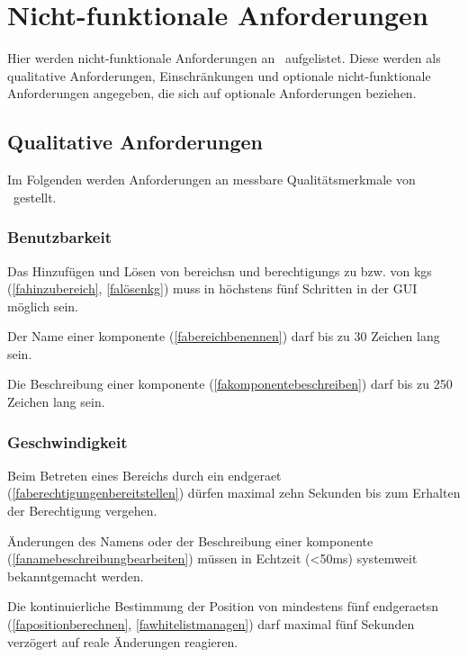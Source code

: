 \section{Nicht-funktionale Anforderungen}

Hier werden nicht-funktionale Anforderungen an \getProjectName \ aufgelistet. Diese werden als qualitative Anforderungen, Einschränkungen und optionale nicht-funktionale Anforderungen angegeben, die sich auf optionale Anforderungen beziehen.

\subsection{Qualitative Anforderungen}

Im Folgenden werden Anforderungen an messbare Qualitätsmerkmale von \getProjectName \ gestellt.

\subsubsection{Benutzbarkeit}
\begin{nfalist}
	\item Das Hinzufügen und Lösen von \glspl{bereich}n und \glspl{berechtigung} zu bzw. von \glspl{kg} (\ref{fahinzubereich}, \ref{falösenkg}) muss in höchstens fünf Schritten in der GUI möglich sein.
	\item Der Name einer \gls{komponente} (\ref{fabereichbenennen}) darf bis zu 30 Zeichen lang sein.
	\item Die Beschreibung einer \gls{komponente} (\ref{fakomponentebeschreiben}) darf bis zu 250 Zeichen lang sein.
\end{nfalist}
\subsubsection{Geschwindigkeit}
\begin{nfalist}[resume]
	\item Beim Betreten eines Bereichs durch ein \gls{endgeraet} (\ref{faberechtigungenbereitstellen}) dürfen maximal zehn Sekunden bis zum Erhalten der Berechtigung vergehen.
	\item Änderungen des Namens oder der Beschreibung einer \gls{komponente} (\ref{fanamebeschreibungbearbeiten}) müssen in Echtzeit (<50ms) systemweit bekanntgemacht werden.
	\item Die kontinuierliche Bestimmung der Position von mindestens fünf \glspl{endgeraet}n (\ref{fapositionberechnen}, \ref{fawhitelistmanagen}) darf maximal fünf Sekunden verzögert auf reale Änderungen reagieren. 
\end{nfalist}
